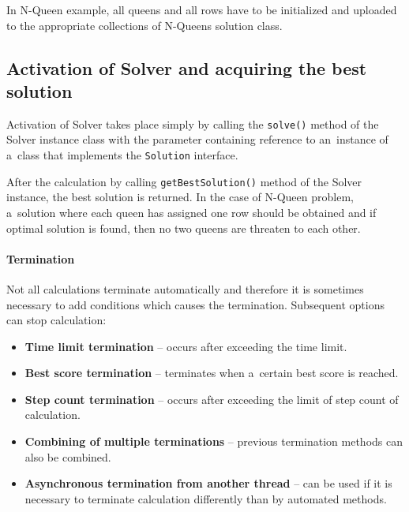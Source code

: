 In N-Queen example, all queens and all rows have to be initialized and uploaded to the appropriate collections of
N-Queens solution class.

\subsection{Activation of Solver and acquiring the best solution}
Activation of Solver takes place simply by calling the \texttt{solve()} method of the Solver instance class with the
parameter containing reference to an~instance of a~class that implements the \texttt{Solution} interface.

After the calculation by calling \texttt{getBestSolution()} method of the Solver instance, the best solution is
returned. In the case of N-Queen problem, a~solution where each queen has assigned one row should be obtained and if
optimal solution is found, then no two queens are threaten to each other.

\paragraph{Termination}
Not all calculations terminate automatically and therefore it is sometimes necessary to add conditions which causes the
termination. Subsequent options can stop calculation:

\begin{itemize}
    \item \textbf{Time limit termination} -- occurs after exceeding the time limit.
    \item \textbf{Best score termination} -- terminates when a~certain best score is reached.
    \item \textbf{Step count termination} -- occurs after exceeding the limit of step count of calculation.
    \item \textbf{Combining of multiple terminations} -- previous termination methods can also be combined.
    \item \textbf{Asynchronous termination from another thread} -- can be used if it is necessary to terminate
    calculation differently than by automated methods.
\end{itemize}
